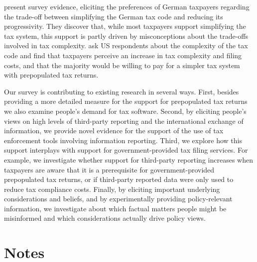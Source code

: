 \documentclass[12pt]{article}
\begin{document}
\textcite{blesse2019people} present survey evidence, eliciting the preferences of German taxpayers regarding the trade-off between simplifying the German tax code and reducing its progressivity. They discover that, while most taxpayers support simplifying the tax system, this support is partly driven by misconceptions about the trade-offs involved in tax complexity. \textcite{benzarti2024rising} ask US respondents about the complexity of the tax code and find that taxpayers perceive an increase in tax complexity and filing costs, and that the majority would be willing to pay for a simpler tax system with prepopulated tax returns.

Our survey is contributing to existing research in several ways. First, besides providing a more detailed measure for the support for prepopulated tax returns we also examine people’s demand for tax software. Second, by eliciting people’s views on high levels of third-party reporting and the international exchange of information, we provide novel evidence for the support of the use of tax enforcement tools involving information reporting. Third, we explore how this support interplays with support for government-provided tax filing services. For example, we investigate whether support for third-party reporting increases when taxpayers are aware that it is a prerequisite for government-provided prepopulated tax returns, or if third-party reported data were only used to reduce tax compliance costs. Finally, by eliciting important underlying considerations and beliefs, and by experimentally providing policy-relevant information, we investigate about which factual matters people might be misinformed and which considerations actually drive policy views. 

\section*{Notes}
\end{document}
